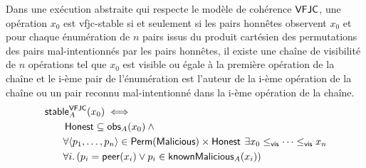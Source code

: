 \begin{theorem}\label{th:vfjc-stable}
Dans une exécution abstraite qui respecte le modèle de cohérence $\operatorname{\mathsf{VFJC}}$, une opération $x_0$ est vfjc-stable si et seulement si les pairs honnêtes observent $x_0$ et pour chaque énumération de $n$ pairs issus du produit cartésien des permutations des pairs mal-intentionnés par les pairs honnêtes, il existe une chaîne de visibilité de $n$ opérations tel que $x_0$ est visible ou égale à la première opération de la chaîne et le i-ème pair de l'énumération est l'auteur de la i-ème opération de la chaîne ou un pair reconnu mal-intentionné dans la i-ème opération de la chaîne.
\begin{equation*}\begin{split}
\MoveEqLeft\trm{stable}_A^{\trm{VFJC}}(x_0) \iff \\
    &\trm{Honest} \subseteq \trm{obs}_A(x_0) \:\land \\
    &\forall \tuple*{p_1,\dotsc, p_n} \in \trm{Perm}(\trm{Malicious}) \times \trm{Honest} \:\exists x_0 \viseq \dotsb \viseq x_n\\
    &\forall i \qsep (p_i = \trm{peer}(x_i) \lor p_i \in \trm{knownMalicious}_A(x_i))
\end{split}\end{equation*}
\end{theorem}



